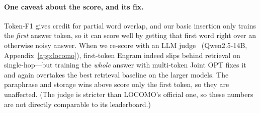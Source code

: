 \documentclass[11pt]{article}
\begin{document}
\begin{table}[t]
  \centering
  \caption{LOCOMO category $\times$ model token-F1. Engram Joint OPT vs.\
  the best retrieval baseline (MEM0\_LIKE or MEMMACHINE\_LIKE)
  per cell. The Engram win is category-dependent
  (Figure~\ref{fig:locomo-categories}).}
  \label{tab:locomo-categories}
\end{table}

\paragraph{One caveat about the score, and its fix.} Token-F1 gives
credit for partial word overlap, and our basic insertion only trains
the \emph{first} answer token, so it can score well by getting that
first word right over an otherwise noisy answer. When we re-score
with an LLM judge~\citep{zheng2023mtbench} (Qwen2.5-14B,
Appendix~\ref{app:locomo}), first-token
Engram indeed slips behind retrieval on single-hop---but training the
\emph{whole} answer with multi-token Joint OPT fixes it and again
overtakes the best retrieval baseline on the larger models. The
paraphrase and storage wins above score only the first token, so they
are unaffected. (The judge is stricter than LOCOMO's official one, so
these numbers are not directly comparable to its leaderboard.)
\end{document}
